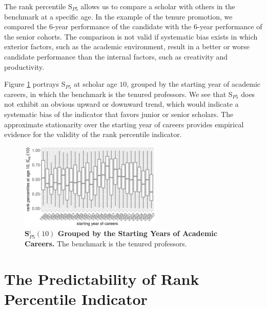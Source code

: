 The rank percentile S$_{P5}$ allows us to compare a scholar with others in the benchmark at a specific age. In the example of the tenure promotion, we compared the 6-year performance of the candidate with the 6-year performance of the senior cohorts. The comparison is not valid if systematic bias exists in which exterior factors, such as the academic environment, result in a better or worse candidate performance than the internal factors, such as creativity and productivity.

Figure \ref{fig:rp_stationarity} portrays S$_{P5}$ at scholar age $10$, grouped by the starting year of academic careers, in which the benchmark is the tenured professors. We see that S$_{P5}$ does not exhibit an obvious upward or downward trend, which would indicate a systematic bias of the indicator that favors junior or senior scholars. The approximate stationarity over the starting year of careers provides empirical evidence for the validity of the rank percentile indicator. 

\begin{figure}[ht!]
    \centering
    \includegraphics[width=0.6\textwidth]{figures/stationarity/rp_stationarity.eps}
    \caption{{\bf S$_{P5}^i(10)$ Grouped by the Starting Years of Academic Careers.}
    The benchmark is the tenured professors.} 
    \label{fig:rp_stationarity}
\end{figure}

\section*{The Predictability of Rank Percentile Indicator}

